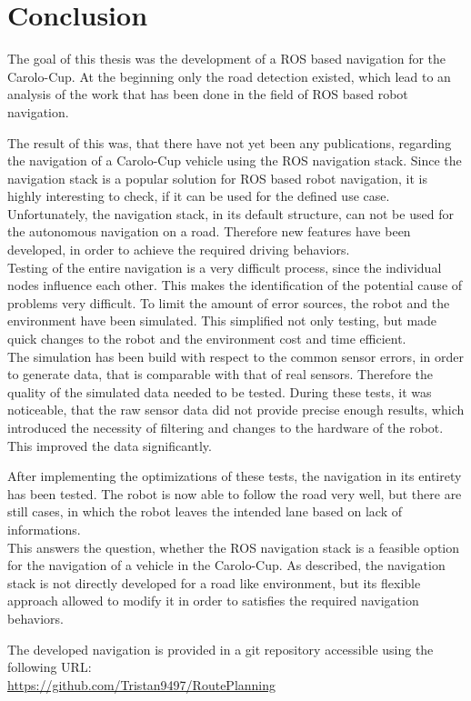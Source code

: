 \chapter{Conclusion}
\label{Conclusion}
The goal of this thesis was the development of a ROS based navigation for the Carolo-Cup. At the beginning only the road detection existed, which lead to an analysis of the work that has been done in the field of ROS based robot navigation.

The result of this was, that there have not yet been any publications, regarding the navigation of a Carolo-Cup vehicle using the ROS navigation stack. Since the navigation stack is a popular solution for ROS based robot navigation, it is highly interesting to check, if it can be used for the defined use case.\\

Unfortunately, the navigation stack, in its default structure, can not be used for the autonomous navigation on a road. Therefore new features have been developed, in order to achieve the required driving behaviors.\\

Testing of the entire navigation is a very difficult process, since the individual nodes influence each other. This makes the identification of the potential cause of problems very difficult. To limit the amount of error sources, the robot and the environment have been simulated. This simplified not only testing, but made quick changes to the robot and the environment cost and time efficient.\\

The simulation has been build with respect to the common sensor errors, in order to generate data, that is comparable with that of real sensors. Therefore the quality of the simulated data needed to be tested.
During these tests, it was noticeable, that the raw sensor data did not provide precise enough results, which introduced the necessity of filtering and changes to the hardware of the robot. This improved the data significantly.

After implementing the optimizations of these tests, the navigation in its entirety has been tested. The robot is now able to follow the road very well, but there are still cases, in which the robot leaves the intended lane based on lack of informations.\\

This answers the question, whether the ROS navigation stack is a feasible option for the navigation of a vehicle in the Carolo-Cup. 
As described, the navigation stack is not directly developed for a road like environment, but its flexible approach allowed to modify it in order to satisfies the required navigation behaviors.

The developed navigation is provided in a git repository accessible using the following URL:\\
\url{https://github.com/Tristan9497/RoutePlanning}\\
